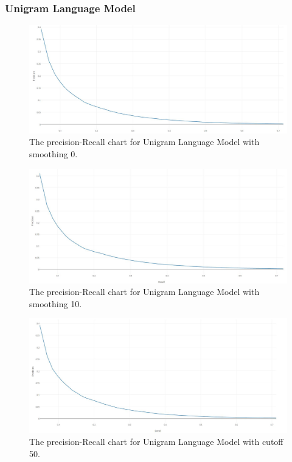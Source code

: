\subsubsection{Unigram Language Model}
\begin{figure}[H]
	\centering
	\includegraphics[width=130mm]{images/uniresult0.jpg}
	\caption{The precision-Recall chart for Unigram Language Model with smoothing 0.}
	\label{fig:uniresult0}
\end{figure}

\begin{figure}[H]
	\centering
	\includegraphics[width=130mm]{images/uniresult10.jpg}
	\caption{The precision-Recall chart for Unigram Language Model with smoothing 10.}
	\label{fig:uniresult10}
\end{figure}


\begin{figure}[H]
	\centering
	\includegraphics[width=130mm]{images/uniresult50.jpg}
	\caption{The precision-Recall chart for Unigram Language Model with cutoff 50.}
	\label{fig:uniresult50}
\end{figure}


